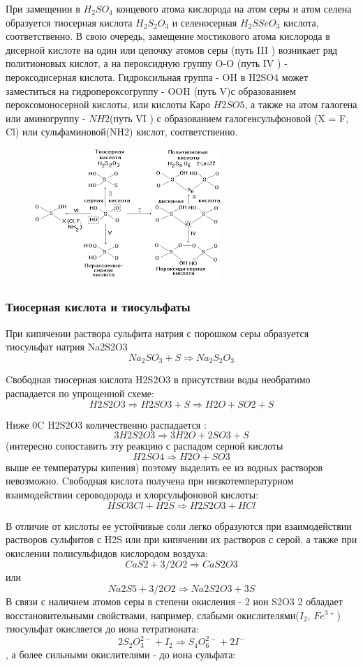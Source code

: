 \documentclass[11pt]{article}
\begin{document}
При замещении в $H_2SO_4$ концевого атома кислорода на атом серы и атом селена образуется тиосерная
кислота $H_2S_2O_3$ и селеносерная $H_2SSeO_3$ кислота, соответственно. В свою очередь, замещение мостикового
атома кислорода в дисерной кислоте на один или цепочку атомов серы (путь III ) возникает
ряд политионовых кислот, а на пероксидную группу O-O (путь IV ) - пероксодисерная кислота.
Гидроксильная группа - OH в H2SO4 может заместиться на гидропероксогруппу - OOH (путь V)с
образованием пероксомоносерной кислоты, или кислоты Каро $H2SO5$, а также на атом галогена или
аминогруппу - $NH2$(путь VI ) с образованием галогенсульфоновой (X = F, Cl) или сульфаминовой(NH2) кислот, соответственно.
\begin{figure}[htp]
\centering
\includegraphics[scale=1.00]{sacids.png}
\caption{}
\label{}
\end{figure}

\subsubsection{Тиосерная кислота и тиосульфаты}

При кипячении раствора сульфита натрия с порошком серы образуется тиосульфат натрия Na2S2O3
$$Na_2SO_3 + S \Rightarrow Na_2S_2O_3$$

Cвободная тиосерная кислота H2S2O3 в присутствии воды необратимо распадается по упрощенной схеме:
$$H2S2O3 \Rightarrow H2SO3 + S \Rightarrow H2O + SO2 + S$$


Hиже 0C H2S2O3 количественно распадается : $$3H2S2O3 \Rightarrow 3H2O + 2SO3 + S$$(интересно сопоставить эту реакцию с распадом серной кислоты $$H2SO4 \Rightarrow H2O + SO3$$ выше ее температуры кипения)
поэтому выделить ее из водных растворов невозможно. Cвободная кислота получена при
низкотемпературном взаимодействии сероводорода и хлорсульфоновой кислоты:
$$HSO3Cl + H2S \Rightarrow H2S2O3 + HCl$$

В отличие от кислоты ее устойчивые соли легко образуются при взаимодействии растворов сульфитов с H2S
или при кипячении их растворов с серой, а также при окислении полисульфидов кислородом воздуха:
$$CaS2 + 3/2O2 \Rightarrow CaS2O3$$ или $$Na2S5 + 3/2O2 \Rightarrow Na2S2O3 + 3S$$
В связи с наличием атомов серы в степени окисления - 2 ион S2O3 2
обладает восстановительными
свойствами, например, слабыми окислителями($I_2$, $Fe^{3+}$)
тиосульфат окисляется до иона тетратионата:
$$2S_2O_3^{2-} + I_2 \Rightarrow S_4O_6^{2-} + 2I^-$$
, а более сильными окислителями - до иона сульфата:
\end{document}
